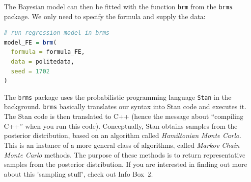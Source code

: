 \documentclass[nobib]{tufte-handout}
\begin{document}
The Bayesian model can then be fitted with the function \texttt{brm} from the \texttt{brms} package. We only need to specify the formula and supply the data:

\bigskip

\begin{minipage}[]{\textwidth}
\begin{lstlisting}[language=R]
# run regression model in brms
model_FE = brm(
  formula = formula_FE, 
  data = politedata, 
  seed = 1702 
)
\end{lstlisting}
\end{minipage}

\noindent The \texttt{brms} package uses the probabilistic programming language \texttt{Stan}
in the background. \texttt{brms} basically translates our syntax into Stan code and
executes it. The Stan code  is then translated to C++ (hence the message about ``compiling
C++'' when you run this code). Conceptually, Stan obtains samples from the posterior
distribution, based on an algorithm called \emph{Hamiltonian Monte Carlo}. This is an instance
of a more general class of algorithms, called \emph{Markov Chain Monte Carlo} methods. The
purpose of these methods is to return representative samples from the posterior distribution.
If you are interested in finding out more about this 'sampling stuff', check out Info Box~2.
\end{document}
